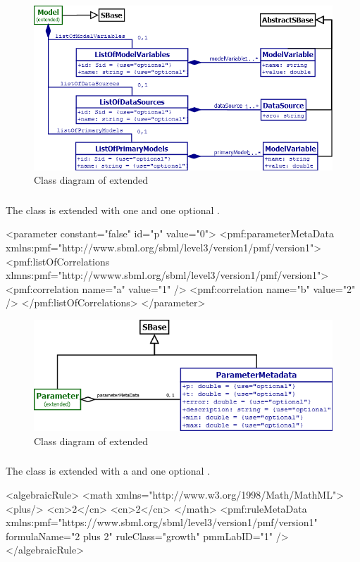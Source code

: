 \begin{figure}
	\includegraphics[scale=0.6]{img/model_uml}
	\caption{Class diagram of extended \Model}
	\label{model_uml}
\end{figure}

\subsubsection{}
The \Parameter class is extended with one \ListOfCorrelations and one optional
\ParameterMetaData.

\begin{example}
<parameter constant="false" id="p" value="0">
  <pmf:parameterMetaData xmlns:pmf="http://www.sbml.org/sbml/level3/version1/pmf/version1">
  <pmf:listOfCorrelations xlmns:pmf="http://wwww.sbml.org/sbml/level3/version1/pmf/version1">
    <pmf:correlation name="a" value="1" />
    <pmf:correlation name="b" value="2" />
  </pmf:listOfCorrelations>
</parameter>
\end{example}

\begin{figure}
	\includegraphics[scale=0.7]{img/parameter_uml}
	\caption{Class diagram of extended \Parameter}
	\label{parameter_uml}
\end{figure}

\subsubsection{}
The \Rule class is extended with a \ListOfReferences and one optional
\RuleMetaData.
\begin{example}
<algebraicRule>
  <math xmlns="http://www.w3.org/1998/Math/MathML">
    <plus/>
    <cn>2</cn>
    <cn>2</cn>
  </math>
  <pmf:ruleMetaData xmlns:pmf="https://www.sbml.org/sbml/level3/version1/pmf/version1"
    formulaName="2 plus 2" ruleClass="growth" pmmLabID="1" />
</algebraicRule>
\end{example}

